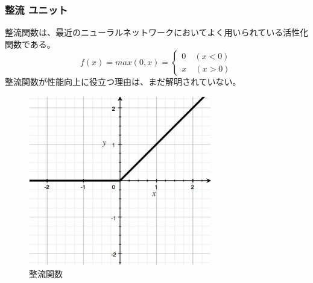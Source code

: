 \subsubsection{整流 ユニット}
整流関数は、最近のニューラルネットワークにおいてよく用いられている活性化関数である。
\begin{equation}
f(x) = max(0, x) = \left\{\begin{array}{cc} 0\quad (x < 0)\\ x \quad (x > 0)\end{array}\right.
\end{equation}
整流関数が性能向上に役立つ理由は、まだ解明されていない。

\begin{figure}[tbp]
 \centering
  \includegraphics[width=80mm]{img/c3/rectifier}
 \caption{整流関数}
 \label{c3_整流}
\end{figure}

